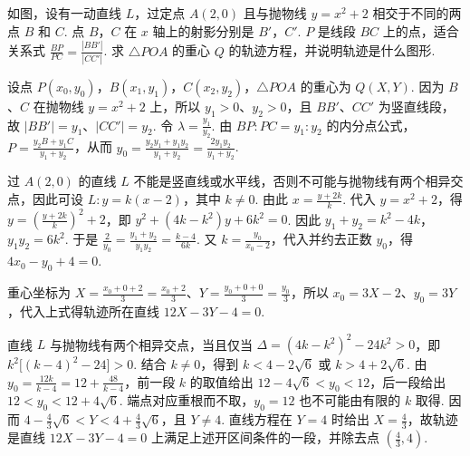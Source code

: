 \documentclass[UTF8,a4paper,oneside,11pt]{ctexbook}
\begin{document}
\begin{problem}
如图，设有一动直线 \(L\)，过定点 \(A(2,0)\) 且与抛物线 \(y = x^2 + 2\) 相交于不同的两点 \(B\) 和 \(C\). 点 \(B\)，\(C\) 在 \(x\) 轴上的射影分别是 \(B'\)，\(C'\). \(P\) 是线段 \(BC\) 上的点，适合关系式 \(\frac{BP}{PC} = \frac{|BB'|}{|CC'|}\). 求 \(\triangle POA\) 的重心 \(Q\) 的轨迹方程，并说明轨迹是什么图形.

\end{problem}

\begin{solution}
设点 \(P(x_0,y_0)\)，\(B(x_1,y_1)\)，\(C(x_2,y_2)\)，\(\triangle POA\) 的重心为 \(Q(X,Y)\). 因为 \(B\)、\(C\) 在抛物线 \(y=x^2+2\) 上，所以 \(y_1>0\)、\(y_2>0\)，且 \(BB'\)、\(CC'\) 为竖直线段，故 \(|BB'|=y_1\)、\(|CC'|=y_2\). 令 \(\lambda=\frac{y_1}{y_2}\). 由 \(BP:PC=y_1:y_2\) 的内分点公式，
\(P=\frac{y_2B+y_1C}{y_1+y_2}\)，从而
\(y_0=\frac{y_2y_1+y_1y_2}{y_1+y_2}=\frac{2y_1y_2}{y_1+y_2}\).

过 \(A(2,0)\) 的直线 \(L\) 不能是竖直线或水平线，否则不可能与抛物线有两个相异交点，因此可设 \(L:y=k(x-2)\)，其中 \(k\neq0\). 由此 \(x=\frac{y+2k}{k}\). 代入 \(y=x^2+2\)，得
\(y=\left(\frac{y+2k}{k}\right)^2+2\)，即 \(y^2+(4k-k^2)y+6k^2=0\). 因此 \(y_1+y_2=k^2-4k\)，\(y_1y_2=6k^2\). 于是
\(\frac2{y_0}=\frac{y_1+y_2}{y_1y_2}=\frac{k-4}{6k}\). 又 \(k=\frac{y_0}{x_0-2}\)，代入并约去正数 \(y_0\)，得 \(4x_0-y_0+4=0\).

重心坐标为 \(X=\frac{x_0+0+2}{3}=\frac{x_0+2}{3}\)、\(Y=\frac{y_0+0+0}{3}=\frac{y_0}{3}\)，所以 \(x_0=3X-2\)、\(y_0=3Y\)，代入上式得轨迹所在直线
\(12X-3Y-4=0\).

直线 \(L\) 与抛物线有两个相异交点，当且仅当
\(\Delta=(4k-k^2)^2-24k^2>0\)，即 \(k^2\bigl[(k-4)^2-24\bigr]>0\). 结合 \(k\neq0\)，得到 \(k<4-2\sqrt6\) 或 \(k>4+2\sqrt6\). 由
\(y_0=\frac{12k}{k-4}=12+\frac{48}{k-4}\)，前一段 \(k\) 的取值给出 \(12-4\sqrt6<y_0<12\)，后一段给出 \(12<y_0<12+4\sqrt6\). 端点对应重根而不取，\(y_0=12\) 也不可能由有限的 \(k\) 取得. 因而
\(4-\frac43\sqrt6<Y<4+\frac43\sqrt6\)，且 \(Y\neq4\). 直线方程在 \(Y=4\) 时给出 \(X=\frac43\)，故轨迹是直线 \(12X-3Y-4=0\) 上满足上述开区间条件的一段，并除去点 \(\left(\frac43,4\right)\).
\end{solution}
\end{document}
